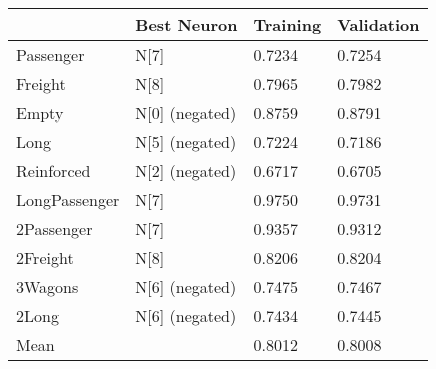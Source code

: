 \begin{tabular}{llll}
\toprule
 & Best Neuron & Training & Validation \\
\midrule
Passenger & N[7] & 0.7234 & 0.7254 \\
Freight & N[8] & 0.7965 & 0.7982 \\
Empty & N[0] (negated) & 0.8759 & 0.8791 \\
Long & N[5] (negated) & 0.7224 & 0.7186 \\
Reinforced & N[2] (negated) & 0.6717 & 0.6705 \\
LongPassenger & N[7] & 0.9750 & 0.9731 \\
2Passenger & N[7] & 0.9357 & 0.9312 \\
2Freight & N[8] & 0.8206 & 0.8204 \\
3Wagons & N[6] (negated) & 0.7475 & 0.7467 \\
2Long & N[6] (negated) & 0.7434 & 0.7445 \\
Mean &  & 0.8012 & 0.8008 \\
\bottomrule
\end{tabular}
